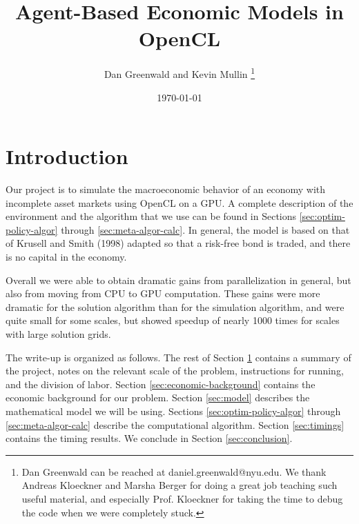 \documentclass[a4paper,12pt]{article}
\numberwithin{equation}{section}
\theoremstyle{definition}
\begin{document}
\small

\setlength\voffset{-0.75 in}

\changepage{1.5 in}{1 in}{0 in}{-0.5 in}{0 in}{0 in}{0 in}{0 in}{0 in}

\title{\textbf{Agent-Based Economic Models in OpenCL}}

\author{ Dan Greenwald and Kevin Mullin \thanks{Dan Greenwald can be
    reached at daniel.greenwald@nyu.edu. We thank Andreas Kloeckner
    and Marsha Berger for doing a great job teaching such useful
    material, and especially Prof. Kloeckner for taking the time to
    debug the code when we were completely stuck.  }}

\date{\today}

\maketitle

\section{Introduction}
\label{sec:introduction}

Our project is to simulate the macroeconomic behavior of an economy
with incomplete asset markets using OpenCL on a GPU. A complete
description of the environment and the algorithm that we use can be
found in Sections \ref{sec:optim-policy-algor} through
\ref{sec:meta-algor-calc}. In general, the model is based on that of
Krusell and Smith (1998) adapted so that a risk-free bond is traded,
and there is no capital in the economy.

Overall we were able to obtain dramatic gains from parallelization
in general, but also from moving from CPU to GPU computation. These
gains were more dramatic for the solution algorithm than for the
simulation algorithm, and were quite small for some scales, but
showed speedup of nearly 1000 times for scales with large solution
grids.

The write-up is organized as follows. The rest of Section
\ref{sec:introduction} contains a summary of the project, notes on
the relevant scale of the problem, instructions for running, and the
division of labor. Section \ref{sec:economic-background} contains
the economic background for our problem. Section \ref{sec:model}
describes the mathematical model we will be using. Sections
\ref{sec:optim-policy-algor} through \ref{sec:meta-algor-calc}
describe the computational algorithm. Section \ref{sec:timings}
contains the timing results. We conclude in Section
\ref{sec:conclusion}.
\end{document}
